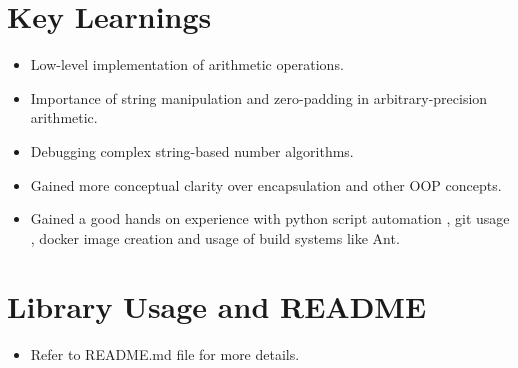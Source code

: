 \documentclass{article}
\begin{document}
\section{Key Learnings}
\begin{itemize}
  \item Low-level implementation of arithmetic operations.
  \item Importance of string manipulation and zero-padding in arbitrary-precision arithmetic.
  \item Debugging complex string-based number algorithms.
  \item Gained more conceptual clarity over encapsulation and other OOP concepts.
  \item Gained a good hands on experience with python script automation , git usage , docker image creation and usage of build systems like Ant.
\end{itemize}

\section{Library Usage and README}
\begin{itemize}
    \item Refer to README.md file for more details.
\end{itemize}
\end{document}
